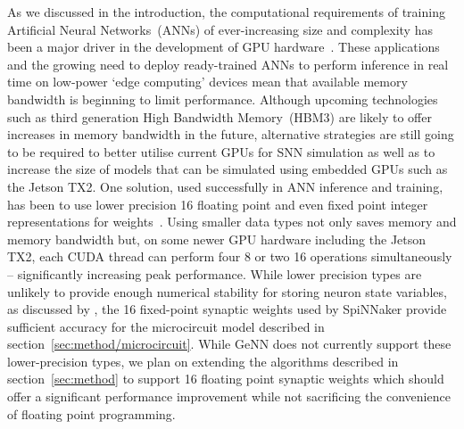 \documentclass[utf8]{frontiersSCNS} %
\begin{document}
As we discussed in the introduction, the computational requirements of training Artificial Neural Networks~(ANNs) of ever-increasing size and complexity has been a major driver in the development of GPU hardware~\citep{Schmidhuber2015}.
These applications and the growing need to deploy ready-trained ANNs to perform inference in real time on low-power `edge computing' devices mean that available memory bandwidth is beginning to limit performance.
Although upcoming technologies such as third generation High Bandwidth Memory~(HBM3) are likely to offer increases in memory bandwidth in the future, alternative strategies are still going to be required to better utilise current GPUs for SNN simulation as well as to increase the size of models that can be simulated using embedded GPUs such as the Jetson TX2.
One solution, used successfully in ANN inference and training, has been to use lower precision \SI{16}{\bit} floating point and even fixed point integer representations for weights~\citep{Micikevicius2017}.
Using smaller data types not only saves memory and memory bandwidth but, on some newer GPU hardware including the Jetson TX2, each CUDA thread can perform four \SI{8}{\bit} or two \SI{16}{\bit} operations simultaneously -- significantly increasing peak performance.
While lower precision types are unlikely to provide enough numerical stability for storing neuron state variables, as discussed by \citet{VanAlbada2018}, the \SI{16}{\bit} fixed-point synaptic weights used by SpiNNaker provide sufficient accuracy for the microcircuit model described in section~\ref{sec:method/microcircuit}.
While GeNN does not currently support these lower-precision types, we plan on extending the algorithms described in section~\ref{sec:method} to support \SI{16}{\bit} floating point synaptic weights which should offer a significant performance improvement while not sacrificing the convenience of floating point programming.
\end{document}
